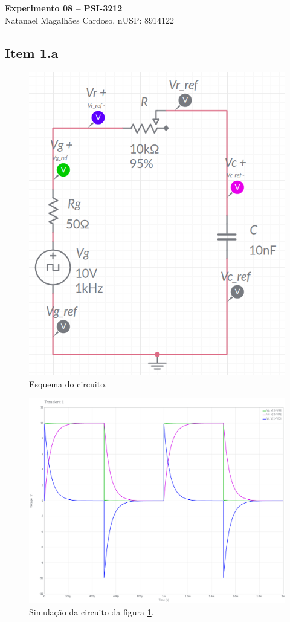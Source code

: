 \documentclass[11pt]{article}
\begin{document}
\begin{center}
  \textbf{Experimento 08 -- PSI-3212} \\
  Natanael Magalhães Cardoso, nUSP: 8914122
\end{center}

\subsection*{Item 1.a}

\begin{figure}[h!]
  \centering
  \includegraphics[width=.56\textwidth]{fig/1-circ}
  \caption{Esquema do circuito.}
  \label{fig:1-circ}
\end{figure}

\begin{figure}[h!]
  \centering
  \includegraphics[width=.9\textwidth]{fig/1-sim}
  \caption{Simulação da circuito da figura \ref{fig:1-circ}.}
  \label{fig:1-sim}
\end{figure}
\end{document}
